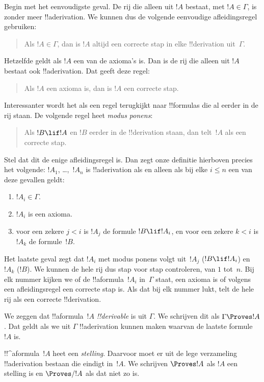 \documentclass[../../../include/open-logic-section]{subfiles}
\begin{document}
Begin met het eenvoudigste geval. De rij die alleen uit $!A$ bestaat,
met $!A \in \Gamma$, is zonder meer !!a{derivation}. We kunnen dus de
volgende eenvoudige afleidingsregel gebruiken:
\begin{quote}
  Als $!A \in \Gamma$, dan is $!A$ altijd een correcte stap in elke
  !!{derivation} uit~$\Gamma$.
\end{quote}
Hetzelfde geldt als $!A$ een van de axioma's is. Dan is de rij die
alleen uit $!A$ bestaat ook !!a{derivation}. Dat geeft deze regel:
\begin{quote}
  Als $!A$ een axioma is, dan is $!A$ een correcte stap.
\end{quote}
Interessanter wordt het als een regel terugkijkt naar !!{formula}s die
al eerder in de rij staan. De volgende regel heet \emph{modus ponens}:
\begin{quote}
  Als $!B \lif !A$ en $!B$ eerder in de !!{derivation} staan, dan
  telt~$!A$ als een correcte stap.
\end{quote}
Stel dat dit de enige afleidingsregel is. Dan zegt onze definitie
hierboven precies het volgende: $!A_1$, \dots,~$!A_n$ is
!!a{derivation} als en alleen als bij elke $i \le n$ een van deze
gevallen geldt:
\begin{enumerate}
\item $!A_i \in \Gamma$.
\item $!A_i$ is een axioma.
\item voor een zekere $j < i$ is $!A_j$ de formule $!B \lif !A_i$, en
  voor een zekere $k < i$ is $!A_k$ de formule~$!B$.
\end{enumerate}
Het laatste geval zegt dat $!A_i$ met modus ponens volgt uit~$!A_j$
($!B \lif !A_i$) en $!A_k$ ($!B$). We kunnen de hele rij dus stap voor
stap controleren, van $1$ tot~$n$. Bij elk nummer kijken we of de
!!a{formula}~$!A_i$ in~$\Gamma$ staat, een axioma is of volgens een
afleidingsregel een correcte stap is. Als dat bij elk nummer lukt, telt
de hele rij als een correcte !!{derivation}.

\begin{defn}[!!^{derivability}]
We zeggen dat !!a{formula}~$!A$ \emph{!!{derivable}} is uit $\Gamma$.
We schrijven dit als $\Gamma \Proves !A$. Dat geldt als we uit
$\Gamma$ !!a{derivation} kunnen maken waarvan de laatste formule $!A$
is.
\end{defn}

\begin{defn}[Stellingen]
!!^a{formula}~$!A$ heet een \emph{stelling}. Daarvoor moet er uit de
lege verzameling !!a{derivation} bestaan die eindigt in~$!A$. We
schrijven $\Proves !A$ als $!A$ een stelling is en $\Proves/ !A$ als
dat niet zo is.
\end{defn}
\end{document}
